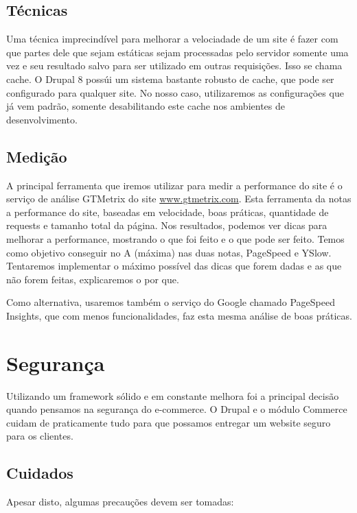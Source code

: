 \subsection{Técnicas}
Uma técnica imprecindível para melhorar a velociadade de um site é fazer com que partes dele que sejam estáticas sejam processadas pelo servidor somente uma vez e seu resultado salvo para ser utilizado em outras requisições. Isso se chama cache. O Drupal 8 possúi um sistema bastante robusto de cache, que pode ser configurado para qualquer site. No nosso caso, utilizaremos as configurações que já vem padrão, somente desabilitando este cache nos ambientes de desenvolvimento.

\subsection{Medição}
A principal ferramenta que iremos utilizar para medir a performance do site é o serviço de análise GTMetrix do site \url{www.gtmetrix.com}. Esta ferramenta da notas a performance do site, baseadas em velocidade, boas práticas, quantidade de requests e tamanho total da página. Nos resultados, podemos ver dicas para melhorar a performance, mostrando o que foi feito e o que pode ser feito. Temos como objetivo conseguir no A (máxima) nas duas notas, PageSpeed e YSlow. Tentaremos implementar o máximo possível das dicas que forem dadas e as que não forem feitas, explicaremos o por que.

Como alternativa, usaremos também o serviço do Google chamado PageSpeed Insights, que com menos funcionalidades, faz esta mesma análise de boas práticas.


\section{Segurança}

Utilizando um framework sólido e em constante melhora foi a principal decisão quando pensamos na segurança do e-commerce. O Drupal e o módulo Commerce cuidam de praticamente tudo para que possamos entregar um website seguro para os clientes.

\subsection{Cuidados}
Apesar disto, algumas precauções devem ser tomadas:

